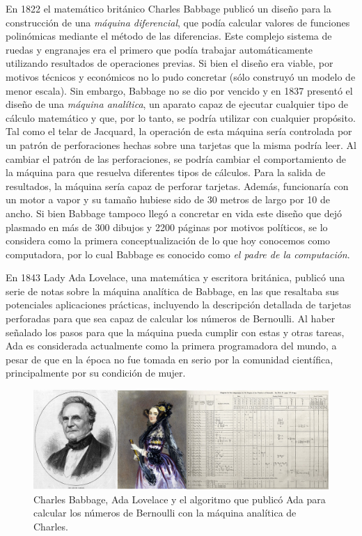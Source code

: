 \documentclass[
]{book}
\begin{document}
En 1822 el matemático británico Charles Babbage publicó un diseño para la construcción de una \emph{máquina diferencial}, que podía calcular valores de funciones polinómicas mediante el método de las diferencias. Este complejo sistema de ruedas y engranajes era el primero que podía trabajar automáticamente utilizando resultados de operaciones previas. Si bien el diseño era viable, por motivos técnicos y económicos no lo pudo concretar (sólo construyó un modelo de menor escala). Sin embargo, Babbage no se dio por vencido y en 1837 presentó el diseño de una \emph{máquina analítica}, un aparato capaz de ejecutar cualquier tipo de cálculo matemático y que, por lo tanto, se podría utilizar con cualquier propósito. Tal como el telar de Jacquard, la operación de esta máquina sería controlada por un patrón de perforaciones hechas sobre una tarjetas que la misma podría leer. Al cambiar el patrón de las perforaciones, se podría cambiar el comportamiento de la máquina para que resuelva diferentes tipos de cálculos. Para la salida de resultados, la máquina sería capaz de perforar tarjetas. Además, funcionaría con un motor a vapor y su tamaño hubiese sido de 30 metros de largo por 10 de ancho. Si bien Babbage tampoco llegó a concretar en vida este diseño que dejó plasmado en más de 300 dibujos y 2200 páginas por motivos políticos, se lo considera como la primera conceptualización de lo que hoy conocemos como computadora, por lo cual Babbage es conocido como \emph{el padre de la computación}.

En 1843 Lady Ada Lovelace, una matemática y escritora británica, publicó una serie de notas sobre la máquina analítica de Babbage, en las que resaltaba sus potenciales aplicaciones prácticas, incluyendo la descripción detallada de tarjetas perforadas para que sea capaz de calcular los números de Bernoulli. Al haber señalado los pasos para que la máquina pueda cumplir con estas y otras tareas, Ada es considerada actualmente como la primera programadora del mundo, a pesar de que en la época no fue tomada en serio por la comunidad científica, principalmente por su condición de mujer.

\begin{figure}

{\centering \includegraphics[width=1\linewidth]{images/historia/babbage_ada} 

}

\caption{Charles Babbage, Ada Lovelace y el algoritmo que publicó Ada para calcular los números de Bernoulli con la máquina analítica de Charles.}\label{fig:unnamed-chunk-2}
\end{figure}
\end{document}
